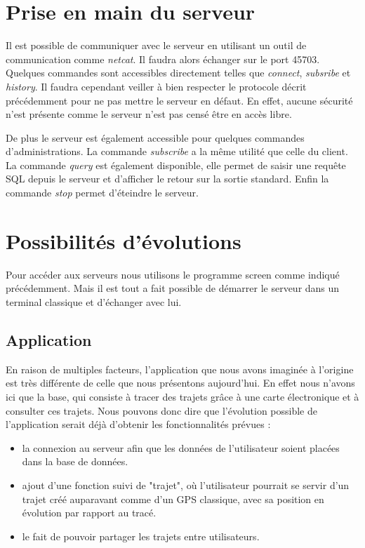 \vspace{5cm}
\section{Prise en main du serveur}
Il est possible de communiquer avec le serveur en utilisant un outil de communication comme \emph{netcat}. Il faudra alors échanger sur le port 45703. Quelques commandes sont accessibles directement telles que \emph{connect}, \emph{subsribe} et \emph{history}. Il faudra cependant veiller à bien respecter le protocole décrit précédemment pour ne pas mettre le serveur en défaut. En effet, aucune sécurité n'est présente comme le serveur n'est pas censé être en accès libre.
\par
De plus le serveur est également accessible pour quelques commandes d'administrations. La commande \emph{subscribe} a la même utilité que celle du client.
La commande \emph{query} est également disponible, elle permet de saisir une requête SQL depuis le serveur et d'afficher le retour sur la sortie standard. Enfin la commande \emph{stop} permet d'éteindre le serveur.
\section{Possibilités d'évolutions}
\par
Pour accéder aux serveurs nous utilisons le programme screen comme indiqué précédemment. Mais il est tout a fait possible de démarrer le serveur dans un terminal classique et d'échanger avec lui.
\subsection{Application}
En raison de multiples facteurs, l'application que nous avons imaginée à l'origine est très différente de celle que nous présentons aujourd'hui.
En effet nous n'avons ici que la base, qui consiste à tracer des trajets grâce à une carte électronique et à consulter ces trajets. Nous pouvons
donc dire que l'évolution possible de l'application serait déjà d'obtenir les fonctionnalités prévues :
\newpage
\begin{itemize}
  \item la connexion au serveur afin que les données de l'utilisateur soient placées dans la base de données.
  \item ajout d'une fonction suivi de "trajet", où l'utilisateur pourrait se servir d'un trajet créé auparavant comme d'un GPS classique, avec sa position en évolution par rapport au tracé.
  \item le fait de pouvoir partager les trajets entre utilisateurs.
\end{itemize}

